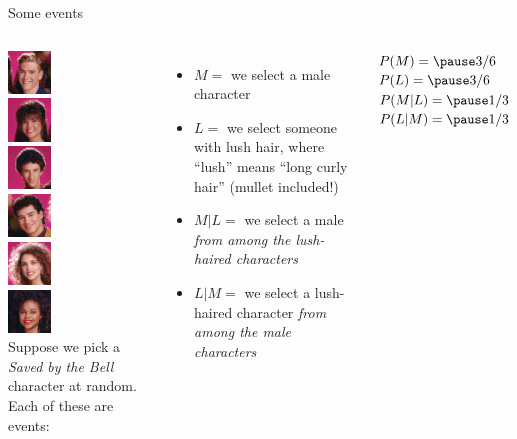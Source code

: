 \documentclass{beamer}\usepackage[]{graphicx}\usepackage[]{color}
\begin{document}
\begin{darkframes}
    \begin{frame}{Some events}
      \begin{columns}[onlytextwidth]
          \includegraphics[width=0.45in]{zack} \\
          \includegraphics[width=0.45in]{kelly} \\
          \includegraphics[width=0.45in]{screech} \\
          \includegraphics[width=0.45in]{slater} \\
          \includegraphics[width=0.45in]{jessie} \\
          \includegraphics[width=0.45in]{lisa} \\
          Suppose we pick a \emph{Saved by the Bell} character at random. Each of these are events:
          \begin{itemize}[<+->]
            \item $M = $ we select a male character
            \item $L = $ we select someone with lush hair, where ``lush'' means ``long curly hair'' (mullet included!)
            \item $M|L = $ we select a male \emph{from among the lush-haired characters}
            \item $L|M = $ we select a lush-haired character \emph{from among the male characters}
          \end{itemize}
          \pause
          $P(M) = \pause 3/6$ \qquad $P(L) = \pause 3/6$ \\
          $P(M|L) = \pause 1/3$ \qquad $P(L|M) = \pause 1/3$ \\
      \end{columns}


\end{frame}
\end{darkframes}
\end{document}

